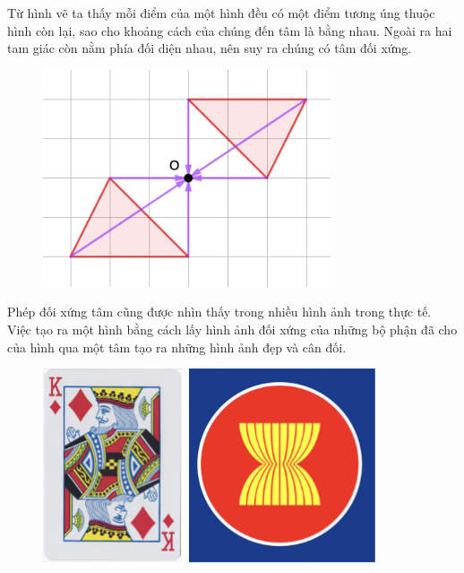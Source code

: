 \begin{multicols}{2}
\begin{figure}[H]
		\vspace*{-10pt}
	\end{figure}
	Từ hình vẽ ta thấy mỗi điểm của một hình đều có một điểm tương úng thuộc hình còn lại, sao cho khoảng cách của chúng đến tâm là bằng nhau. Ngoài ra hai tam giác còn nằm phía đối diện nhau, nên suy ra chúng có tâm đối xứng. 
	\begin{figure}[H]
		\vspace*{-5pt}
		\centering
		\captionsetup{labelformat= empty, justification=centering}
		\includegraphics[width= 0.7\linewidth]{Picture12}
		\vspace*{-10pt}
	\end{figure}
	Phép đối xứng tâm cũng được nhìn thấy trong nhiều hình ảnh trong thực tế. Việc tạo ra một hình bằng cách lấy hình ảnh đối xứng của những bộ phận đã cho của hình qua một tâm tạo ra những hình ảnh đẹp và cân đối.
	\begin{figure}[H]
		\vspace*{-5pt}
		\centering
		\captionsetup{labelformat= empty, justification=centering}
		\includegraphics[height= 0.53\linewidth]{Picture13}
		\includegraphics[height= 0.53\linewidth]{Picture14}

\end{figure}
\end{multicols}
